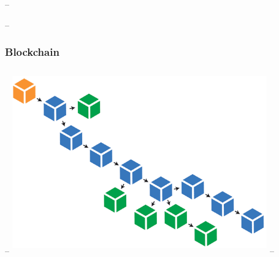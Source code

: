 \documentclass{beamer}
\begin{document}
-- \begin{frame}
-- \frametitle{Blockchain}
-- \includegraphics[width=11cm, height=8cm]{blockchain2}
-- \end{frame}
\end{document}
